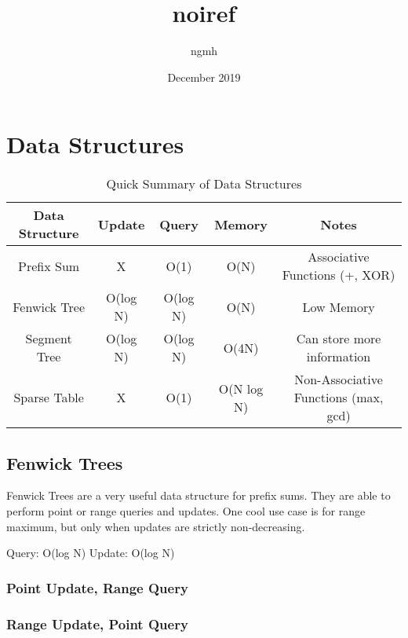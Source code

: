 \documentclass{article}
\title{noiref}
\author{ngmh}
\date{December 2019}
\begin{document}
\maketitle
\tableofcontents
\newpage

\section{Data Structures}

\begin{table}[H]
\begin{tabular}{|c|c|c|c|c|}
\hline
Data Structure & Update   & Query    & Memory     & Notes                                \\ \hline
Prefix Sum     & X        & O(1)     & O(N)       & Associative Functions (+, XOR)       \\ \hline
Fenwick Tree   & O(log N) & O(log N) & O(N)       & Low Memory                           \\ \hline
Segment Tree   & O(log N) & O(log N) & O(4N)      & Can store more information           \\ \hline
Sparse Table   & X        & O(1)     & O(N log N) & Non-Associative Functions (max, gcd) \\ \hline
\end{tabular}
\caption{Quick Summary of Data Structures}
\label{tab:ds}
\end{table}

\subsection{Fenwick Trees}

\begin{flushleft}
Fenwick Trees are a very useful data structure for prefix sums.
They are able to perform point or range queries and updates.
One cool use case is for range maximum, but only when updates are strictly
non-decreasing.

Query: O(log N)
Update: O(log N)
\end{flushleft}

\subsubsection{Point Update, Range Query}

\subsubsection{Range Update, Point Query}

\end{document}
